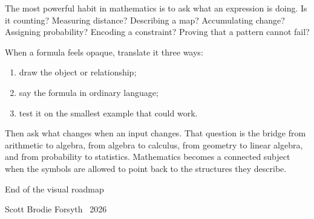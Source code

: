\documentclass[11pt,oneside,openany]{book}
\begin{document}
The most powerful habit in mathematics is to ask what an expression is doing. Is it counting? Measuring distance? Describing a map? Accumulating change? Assigning probability? Encoding a constraint? Proving that a pattern cannot fail?

When a formula feels opaque, translate it three ways:

\begin{enumerate}
  \item draw the object or relationship;
  \item say the formula in ordinary language;
  \item test it on the smallest example that could work.
\end{enumerate}

Then ask what changes when an input changes. That question is the bridge from arithmetic to algebra, from algebra to calculus, from geometry to linear algebra, and from probability to statistics. Mathematics becomes a connected subject when the symbols are allowed to point back to the structures they describe.

\begin{center}
\end{center}

\vfill
\begin{center}
\textcolor{muted}{\small End of the visual roadmap}\par
\textcolor{muted}{\small Scott Brodie Forsyth \textbullet\ 2026}
\end{center}
\end{document}
